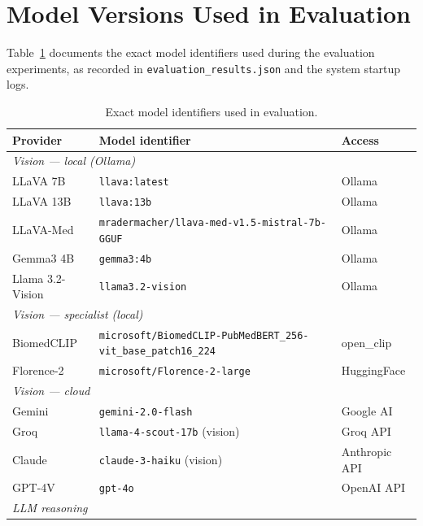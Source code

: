 \documentclass[12pt,a4paper]{report}
\begin{document}
\section{Model Versions Used in Evaluation}

Table~\ref{tab:model_versions} documents the exact model identifiers used
during the evaluation experiments, as recorded in
\texttt{evaluation\_results.json} and the system startup logs.

\begin{table}[H]
\centering
\caption{Exact model identifiers used in evaluation.}
\label{tab:model_versions}
\small
\renewcommand{\arraystretch}{1.2}
\begin{tabularx}{\textwidth}{@{}l l l@{}}
\toprule
\textbf{Provider} & \textbf{Model identifier} & \textbf{Access} \\
\midrule
\multicolumn{3}{l}{\textit{Vision --- local (Ollama)}} \\
LLaVA 7B         & \texttt{llava:latest}                            & Ollama \\
LLaVA 13B        & \texttt{llava:13b}                               & Ollama \\
LLaVA-Med        & \texttt{mradermacher/llava-med-v1.5-mistral-7b-GGUF} & Ollama \\
Gemma3 4B        & \texttt{gemma3:4b}                               & Ollama \\
Llama 3.2-Vision & \texttt{llama3.2-vision}                         & Ollama \\
\multicolumn{3}{l}{\textit{Vision --- specialist (local)}} \\
BiomedCLIP       & \texttt{microsoft/BiomedCLIP-PubMedBERT\_256-vit\_base\_patch16\_224} & open\_clip \\
Florence-2       & \texttt{microsoft/Florence-2-large}               & HuggingFace \\
\multicolumn{3}{l}{\textit{Vision --- cloud}} \\
Gemini           & \texttt{gemini-2.0-flash}                        & Google AI \\
Groq             & \texttt{llama-4-scout-17b} (vision)              & Groq API \\
Claude           & \texttt{claude-3-haiku} (vision)              & Anthropic API \\
GPT-4V           & \texttt{gpt-4o}                                  & OpenAI API \\
\midrule
\multicolumn{3}{l}{\textit{LLM reasoning}} \\

\end{tabularx}
\end{table}
\end{document}
